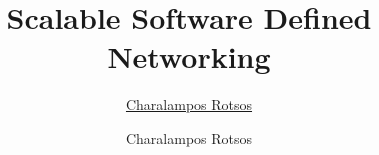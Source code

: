 \documentclass[oneside,12pt]{Classes/CUEDthesisPSnPDF}
\title{Scalable Software Defined Networking}
\author{\href{mailto:Charalampos.Rotsos@cl.cam.ac.uk}{Charalampos Rotsos}}
\author{Charalampos Rotsos}
\begin{document}

\begin{abstractseparate}
  
\end{abstractseparate}


\maketitle

\setcounter{secnumdepth}{3}
\setcounter{tocdepth}{3}


\frontmatter %
%
%
%

\tableofcontents
\listoffigures
\printnomenclature  %

\newpage
\listoftodos
\newpage


\mainmatter %











\backmatter %
\appendix
%
%


%
%
\renewcommand{\bibname}{References} %
\end{document}
